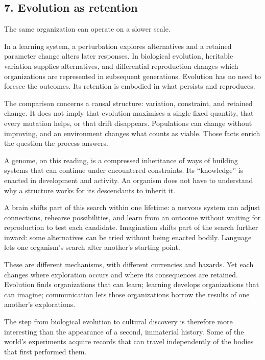 \documentclass[
  11pt,
]{article}
\begin{document}
\subsection{7. Evolution as retention}\label{evolution-as-retention}

The same organization can operate on a slower scale.

In a learning system, a perturbation explores alternatives and a
retained parameter change alters later responses. In biological
evolution, heritable variation supplies alternatives, and differential
reproduction changes which organizations are represented in subsequent
generations. Evolution has no need to foresee the outcomes. Its
retention is embodied in what persists and reproduces.

The comparison concerns a causal structure: variation, constraint, and
retained change. It does not imply that evolution maximises a single
fixed quantity, that every mutation helps, or that drift disappears.
Populations can change without improving, and an environment changes
what counts as viable. Those facts enrich the question the process
answers.

A genome, on this reading, is a compressed inheritance of ways of
building systems that can continue under encountered constraints. Its
``knowledge'' is enacted in development and activity. An organism does
not have to understand why a structure works for its descendants to
inherit it.

A brain shifts part of this search within one lifetime: a nervous system
can adjust connections, rehearse possibilities, and learn from an
outcome without waiting for reproduction to test each candidate.
Imagination shifts part of the search further inward: some alternatives
can be tried without being enacted bodily. Language lets one organism's
search alter another's starting point.

These are different mechanisms, with different currencies and hazards.
Yet each changes where exploration occurs and where its consequences are
retained. Evolution finds organizations that can learn; learning
develops organizations that can imagine; communication lets those
organizations borrow the results of one another's explorations.

The step from biological evolution to cultural discovery is therefore
more interesting than the appearance of a second, immaterial history.
Some of the world's experiments acquire records that can travel
independently of the bodies that first performed them.
\end{document}
